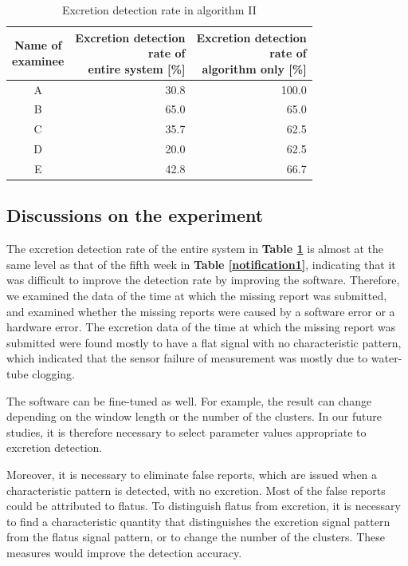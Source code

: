 \documentclass[publish,JRM,paper]{jaciiiarticle}
\begin{document}
\begin{table}[t]
\begin{center}
\caption{Excretion detection rate in algorithm I\hspace{-.1em}I}
\begin{tabular}[t]{c|r|r}
\hline
  \shortstack{Name of \\examinee} & \shortstack{Excretion detection\\rate of\\entire system [\%]} & \shortstack{Excretion detection\\rate of\\algorithm only [\%]} \\
\hline
A & 30.8 & 100.0 \\
\hline
B & 65.0 & 65.0 \\
\hline
C & 35.7 & 62.5 \\
\hline
D & 20.0 & 62.5 \\
\hline
E & 42.8 & 66.7 \\
\hline
\end{tabular}
\label{notification2}
\end{center}
\end{table}

\subsection{Discussions on the experiment}
The excretion detection rate of the entire system in {\bf Table \ref{notification2}} is almost at the same level as that of the fifth week in {\bf Table \ref{notification1}}, indicating that it was difficult to improve the detection rate by improving the software. Therefore, we examined the data of the time at which the missing report was submitted, and examined whether the missing reports were caused by a software error or a hardware error. The excretion data of the time at which the missing report was submitted were found mostly to have a flat signal with no characteristic pattern, which indicated that the sensor failure of measurement was mostly due to water-tube clogging.

The software can be fine-tuned as well. For example, the result can change depending on the window length or the number of the clusters. In our future studies, it is therefore necessary to select parameter values appropriate to excretion detection.

Moreover, it is necessary to eliminate false reports, which are issued when a characteristic pattern is detected, with no excretion. Most of the false reports could be attributed to flatus. To distinguish flatus from excretion, it is necessary to find a characteristic quantity that distinguishes the excretion signal pattern from the flatus signal pattern, or to change the number of the clusters. These measures would improve the detection accuracy.
\end{document}
